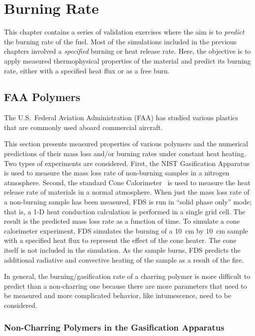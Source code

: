 
\chapter{Burning Rate}

This chapter contains a series of validation exercises where the aim is to {\em predict} the burning rate of the fuel. Most of the simulations included in the previous chapters involved
a {\em specified} burning or heat release rate. Here, the objective is to apply measured thermophysical properties of the material and predict its burning rate, either with a
specified heat flux or as a free burn.


\section{FAA Polymers}

The U.S.~Federal Aviation Administration (FAA) has studied various plastics that are commonly used aboard commercial aircraft. 

This section presents measured properties of various polymers and the numerical predictions of their mass loss and/or burning rates under constant heat heating. 
Two types of experiments are considered. First, the NIST Gasification Apparatus is used to measure the mass loss rate of non-burning samples in a nitrogen atmosphere. 
Second, the standard Cone Calorimeter~\cite{conecal} is used to measure the heat release rate of materials in a normal atmosphere. 
When just the mass loss rate of a non-burning sample has been measured, FDS is run in ``solid phase only'' mode; that is, a 1-D heat conduction calculation is performed in a
single grid cell. The result is the predicted mass loss rate as a function of time. To simulate a cone calorimeter experiment, FDS simulates the burning of a 10~cm by 10~cm sample with
a specified heat flux to represent the effect of the cone heater. The cone itself is not included in the simulation. As the sample burns, FDS predicts the additional radiative and
convective heating of the sample as a result of the fire.

In general, the burning/gasification rate of a charring polymer is more difficult to predict than a non-charring one because there are more parameters that need to be measured and
more complicated behavior, like intumescence, need to be considered.


\newpage

\subsection{Non-Charring Polymers in the Gasification Apparatus}

